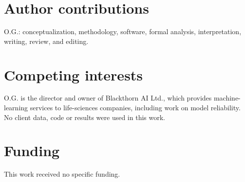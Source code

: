 \documentclass[11pt,letterpaper]{article}
\begin{document}
\section*{Author contributions}
O.G.: conceptualization, methodology, software, formal analysis, interpretation, writing, review, and editing.

\section*{Competing interests}
O.G. is the director and owner of Blackthorn AI Ltd., which provides machine-learning services to life-sciences companies, including work on model reliability. No client data, code or results were used in this work.

\section*{Funding}
This work received no specific funding.



\end{document}
